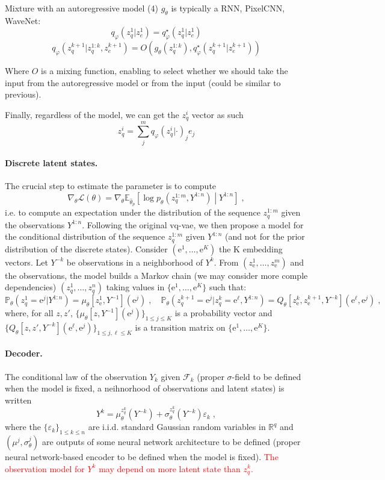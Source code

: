 \documentclass{article}
\newcommand{\rset}{\ensuremath{\mathbb{R}}}
\newcommand{\eqsp}{\;}
\newcommand{\rme}{\mathrm{e}}
\begin{document}
Mixture with an autoregressive model (4) $g_{\theta}$ is typically a RNN, PixelCNN, WaveNet:
$$q_\varphi(z_q^{1}|z_e^{1}) = q^\star_\varphi(z_q^{1}|z_e^{1})$$
$$q_\varphi(z_q^{k+1}|z_q^{1:k},z_e^{k+1}) = O(g_{\theta}(z_q^{1:k}), q^\star_\varphi(z_q^{k+1}|z_e^{k+1}))$$

Where $O$ is a mixing function, enabling to select whether we should take the input from the autoregressive model or from the input (could be similar to previous).


Finally, regardless of the model, we can get the $z_q^{i}$ vector as such
$$ z_q^{i} = \sum_j^m q_\varphi(z_q^{i}|\cdot)_j e_j$$

\clearpage
\newpage

\paragraph{Discrete latent states.} The crucial step to estimate the parameter is to compute
$$
\nabla_\theta\mathcal{L}(\theta) = \nabla_\theta \mathbb{E}_{\hat{\theta}_p}\left[\log p_{\theta}(z^{1:m}_q,Y^{1:n})  \middle | Y^{1:n}\right]\eqsp,
$$
i.e. to compute an expectation under the distribution of the sequence $z^{1:m}_q$ given the observations $Y^{1:n}$. Following the original vq-vae, we then propose a model for the conditional distribution of the sequence $z^{1:m}_q$ given $Y^{1:n}$ (and not for the prior distribution of the discrete states). Consider $(\rme^1,\ldots,\rme^K)$ the K embedding vectors. Let $Y^{-k}$ be observations in a neighborhood of $Y^k$. From $(z_\rme^1,\ldots, z_\rme^m)$ and the observations, the model builds a Markov chain (we may consider more comple dependencies) $(z_q^1,\ldots, z_q^n)$ taking values in $\{\rme^1,\ldots,\rme^K\}$ such that:
$$
\mathbb{P}_\theta(z_q^1 = \rme^j|Y^{1:n}) = \mu_\theta[z_\rme^1,Y^{-1}](\rme^j) \eqsp,\quad \mathbb{P}_\theta(z_q^{k+1} = \rme^j | z_q^{k} =  \rme^\ell,Y^{1:n}) = Q_{\theta}[z_\rme^{k},z_\rme^{k+1},Y^{-k}](\rme^\ell,\rme^j)\eqsp,
$$
where, for all $z,z'$, $\{\mu_{\theta}[z,Y^{-1}](\rme^j)\}_{1\leqslant j\leqslant K}$ is a probability vector and $\{Q_{\theta}[z,z',Y^{-k}](\rme^\ell,\rme^j)\}_{1\leqslant j,\ell\leqslant K}$ is a transition matrix on $\{\rme^1,\ldots, \rme^K\}$.
\paragraph{Decoder.} The conditional law of the observation $Y_{k}$ given $\mathcal{F}_k$ (proper $\sigma$-field to be defined when the model is fixed, a neihnorhood of observations and latent states) is written
$$
Y^{k} = \mu^{z_q^{k}}_\theta(Y^{-k}) + \sigma^{z_q^{k}}_\theta(Y^{-k})\varepsilon_{k}\eqsp,
$$
where the $\{\varepsilon_{k}\}_{1\leqslant k\leqslant n}$ are i.i.d. standard Gaussian random variables in $\rset^q$ and $(\mu^{j},\sigma^{j}_\theta)$ are outputs of some neural network architecture to be defined  (proper neural network-based encoder  to be defined when the model is fixed). \textcolor{red}{The observation model for $Y^k$ may depend on more latent state than $z_q^k$.}
\end{document}
